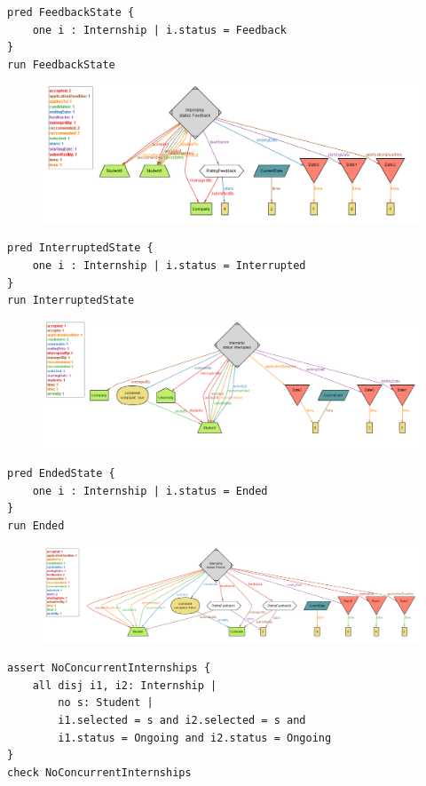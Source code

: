 \documentclass{article}
\begin{document}
\begin{lstlisting}
pred FeedbackState {
    one i : Internship | i.status = Feedback
}
run FeedbackState
\end{lstlisting}
\begin{figure}[H]
    \centering
    \includegraphics[scale = 0.42]{figures/alloy/feed_State.png}
    \centering
\end{figure}
\begin{lstlisting}
pred InterruptedState {
    one i : Internship | i.status = Interrupted
}
run InterruptedState
\end{lstlisting}
\begin{figure}[H]
    \centering
    \includegraphics[scale = 0.42]{figures/alloy/interr_state.png}
    \centering
\end{figure}
\begin{lstlisting}
pred EndedState {
    one i : Internship | i.status = Ended
}
run Ended
\end{lstlisting}
\begin{figure}[H]
    \centering
    \includegraphics[width=1\textwidth]{figures/alloy/end_state.png}
    \centering
\end{figure}
\begin{lstlisting}
assert NoConcurrentInternships {
    all disj i1, i2: Internship | 
        no s: Student | 
        i1.selected = s and i2.selected = s and 
        i1.status = Ongoing and i2.status = Ongoing
}
check NoConcurrentInternships
\end{lstlisting}
\end{document}

